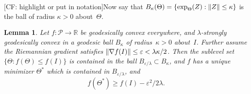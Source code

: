\documentclass[aos]{imsart}
\newtheorem{lemma}[theorem]{Lemma}
\theoremstyle{definition}
\DeclarePairedDelimiter{\norm}{\lVert}{\rVert}
\newcommand{\R}{{\mathbb{R}}}
\newcommand{\eps}{\varepsilon}
\newcommand{\SPD}{\mathcal{P}}
\newcommand{\CF}[1]{{\color{purple}[CF: #1]}}
\newcommand{\RMO}[1]{{\color{red}[RMO: #1]}}
\begin{document}
\noindent
\CF{highlight or put in notation}Now say that $B_\kappa(\Theta) = \{ \exp_{\Theta}(Z) : \norm Z \leq \kappa \}$ is the ball of radius $\kappa>0$ about~$\Theta$.

\begin{lemma}\label{lem:convex-ball}
Let $f\colon \SPD\to \R$ be geodesically convex everywhere, and $\lambda$-strongly geodesically convex in a geodesic ball $B_\kappa$ of radius~$\kappa>0$ about~$I$.
Further assume the Riemannian gradient satisfies $\norm{\nabla f(I)} \leq \eps < \lambda \kappa / 2$.
Then the sublevel set $\{\Theta:f(\Theta) \leq f(I)\}$ is contained in the ball $B_{\eps/\lambda} \subset B_\kappa$, and $f$ has a unique minimizer $\Theta^*$ which is contained in $B_{\eps/\lambda}$, and
$$ f(\Theta^*) \geq f(I) - \eps^2/2 \lambda.$$
\end{lemma}

\end{document}
